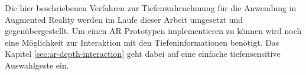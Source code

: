 Die hier beschriebenen Verfahren zur Tiefenwahrnehmung für die Anwendung in Augmented Reality werden im Laufe dieser Arbeit umgesetzt und gegenübergestellt. Um einen AR Prototypen implementieren zu können wird noch eine Möglichkeit zur Interaktion mit den Tiefeninformationen benötigt. Das Kapitel \ref{sec:ar-depth-interaction} geht dabei auf eine einfache tiefensensitive Auswahlgeste ein.\\










